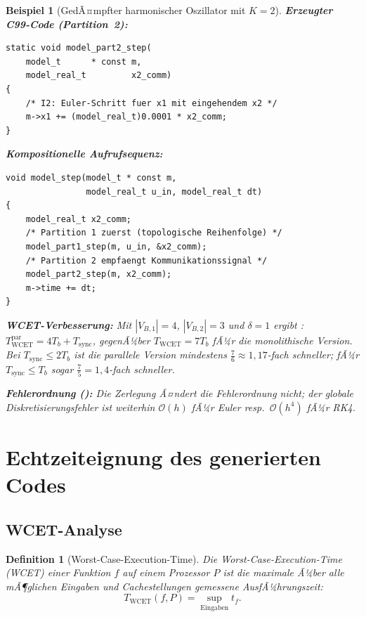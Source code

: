 ﻿\documentclass[12pt,a4paper]{article}
\newtheorem{definition}[theorem]{Definition}
\newtheorem{beispiel}[theorem]{Beispiel}
\theoremstyle{definition}
\begin{document}
\begin{beispiel}[GedÃ¤mpfter harmonischer Oszillator mit $K = 2$]
\textbf{Erzeugter C99-Code (Partition~2):}
\begin{lstlisting}[style=cstyle, caption={Subgraph Algorithmus -- Partie 2: Zustandsintegration}]
static void model_part2_step(
    model_t      * const m,
    model_real_t         x2_comm)
{
    /* I2: Euler-Schritt fuer x1 mit eingehendem x2 */
    m->x1 += (model_real_t)0.0001 * x2_comm;
}
\end{lstlisting}

\textbf{Kompositionelle Aufrufsequenz:}
\begin{lstlisting}[style=cstyle, caption={Kompositionelle Aufrufsequenz des Subgraph Algorithmus}]
void model_step(model_t * const m,
                model_real_t u_in, model_real_t dt)
{
    model_real_t x2_comm;
    /* Partition 1 zuerst (topologische Reihenfolge) */
    model_part1_step(m, u_in, &x2_comm);
    /* Partition 2 empfaengt Kommunikationssignal */
    model_part2_step(m, x2_comm);
    m->time += dt;
}
\end{lstlisting}

\textbf{WCET-Verbesserung:} Mit $|V_{B,1}| = 4$, $|V_{B,2}| = 3$ und
$\delta = 1$ ergibt :
$T_{\mathrm{WCET}}^{\mathrm{par}} = 4 T_b + T_{\mathrm{sync}}$,
gegenÃ¼ber $T_{\mathrm{WCET}} = 7 T_b$ fÃ¼r die monolithische Version.
Bei $T_{\mathrm{sync}} \leq 2 T_b$ ist die parallele Version mindestens
$\frac{7}{6} \approx 1{,}17$-fach schneller; fÃ¼r $T_{\mathrm{sync}} \leq T_b$ sogar
$\frac{7}{5} = 1{,}4$-fach schneller.

\textbf{Fehlerordnung ():}
Die Zerlegung Ã¤ndert die Fehlerordnung nicht;
der globale Diskretisierungsfehler ist weiterhin $\mathcal{O}(h)$ fÃ¼r
Euler resp.\ $\mathcal{O}(h^4)$ fÃ¼r RK4.
\end{beispiel}

\section{Echtzeiteignung des generierten Codes}
\label{sec:rt}


\subsection{WCET-Analyse}

\begin{definition}[Worst-Case-Execution-Time]
Die \emph{Worst-Case-Execution-Time} (WCET) einer Funktion $f$ auf einem
Prozessor $P$ ist die maximale Ã¼ber alle mÃ¶glichen Eingaben und
Cachestellungen gemessene AusfÃ¼hrungszeit:
\[
  T_{\mathrm{WCET}}(f, P) = \sup_{\text{Eingaben}} t_f.
\]
\end{definition}
\end{document}
